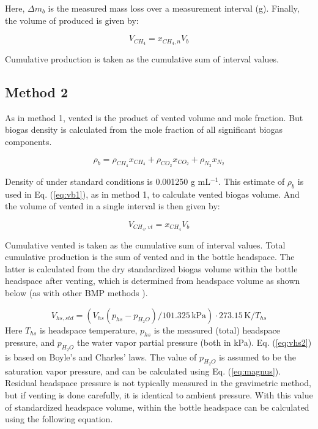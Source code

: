 \documentclass[]{article}
\newcommand{\unit}[1]{\ensuremath{\, \mathrm{#1}}}
\begin{document}
Here, $\Delta m_b$ is the measured mass loss over a measurement interval (g).
Finally, the volume of  produced is given by:

\begin{equation}
  \label{eq:vch41}
  V_{CH_4} = x_{CH_4, n} V_b
\end{equation}

Cumulative production is taken as the cumulative sum of interval values. 

\subsection{Method 2}
As in method 1, vented  is the product of vented volume and  mole fraction.
But biogas density is calculated from the mole fraction of all significant biogas components.

\begin{equation}
  \label{eq:dens2}
  \rho_b = \rho_{CH_4} x_{CH_4} + \rho_{CO_2} x_{CO_2} + \rho_{N_2} x_{N_2}
\end{equation}

Density of  under standard conditions is 0.001250 g mL$^{-1}$.
This estimate of $\rho_b$ is used in Eq. (\ref{eq:vb1}), as in method 1, to calculate vented biogas volume.
And the volume of vented  in a single interval is then given by:

\begin{equation}
  \label{eq:vvch42}
  V_{CH_4,vt} = x_{CH_4} V_b
\end{equation}

Cumulative vented  is taken as the cumulative sum of interval values. 
Total cumulative  production is the sum of vented  and  in the bottle headspace.
The latter is calculated from the dry standardized biogas volume within the bottle headspace after venting, which is determined from headspace volume as shown below (as with other BMP methods \cite{bmpmethods}).

\begin{equation}
  \label{eq:vhs2}
  V_{hs,std} = ( V_{hs}(p_{hs} - p_{H_2O})/101.325 \unit{kPa} ) \cdot 273.15 \unit{K}/T_{hs}
\end{equation}
Here $T_{hs}$ is headspace temperature, $p_{hs}$ is the measured (total) headspace pressure, and $p_{H_2O}$ the water vapor partial pressure (both in kPa).
Eq. (\ref{eq:vhs2}) is based on Boyle's and Charles' laws.
The value of $p_{H_2O}$ is assumed to be the saturation vapor pressure, and can be calculated using Eq. (\ref{eq:magnus}).
Residual headspace pressure is not typically measured in the gravimetric method, but if venting is done carefully, it is identical to ambient pressure.
With this value of standardized headspace volume,  within the bottle headspace can be calculated using the following equation.
\end{document}
